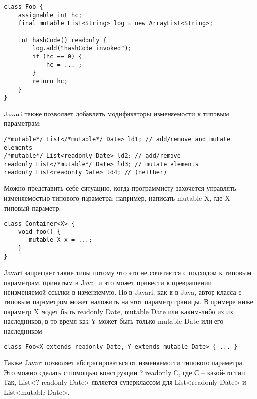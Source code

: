 \begin{lstlisting}[caption=assignable и mutable поля, label=code:assignable_mutable]
class Foo { 
    assignable int hc; 
    final mutable List<String> log = new ArrayList<String>;
    
    int hashCode() readonly { 
        log.add("hashCode invoked");
        if (hc == 0) { 
            hc = ... ;
        } 
        return hc; 
    } 
}
\end{lstlisting}

Javari также позволяет добавлять модификаторы изменяемости к типовым параметрам:

\begin{lstlisting}[caption=Модификаторы изменяемости в типовых параметрах, label=code:javari_generic_local]
/*mutable*/ List</*mutable*/ Date> ld1; // add/remove and mutate elements 
/*mutable*/ List<readonly Date> ld2; // add/remove 
readonly List</*mutable*/ Date> ld3; // mutate elements 
readonly List<readonly Date> ld4; // (neither)
\end{lstlisting} 

Можно представить себе ситуацию, когда программисту захочется управлять изменяемостью типового параметра: например, написать mutable X, где X -- типовый параметр:

\begin{lstlisting}[caption=Модификаторы изменяемости и типовые параметры, label=code:javari_generic_mutable]
class Container<X> {
    void foo() {
       mutable X x = ...;
    }
}
\end{lstlisting} 

Javari запрещает такие типы потому что это не сочетается с подходом к типовым параметрам, принятым в Java, и это может привести к превращении неизменяемой ссылки в изменяемую. Но в Javari, как и в Java, автор класса с типовым параметром может наложить на этот параметр границы. В примере ниже параметр X модет быть readonly Date, mutable Date или каким-либо из их наследников, в то время как Y может быть только mutable Date или его наследником. 

\begin{lstlisting}[caption=Объявление класса с типовыми параметрами, label=code:javari_generic_class]
class Foo<X extends readonly Date, Y extends mutable Date> { ... }
\end{lstlisting} 

Также Javari позволяет абстрагироваться от изменяемости типового параметра. Это можно сделать с помощью конструкции ? readonly C, где С -- какой-то тип. Так, List<? readonly Date> является суперклассом для List<readonly Date> и List<mutable Date>. 

